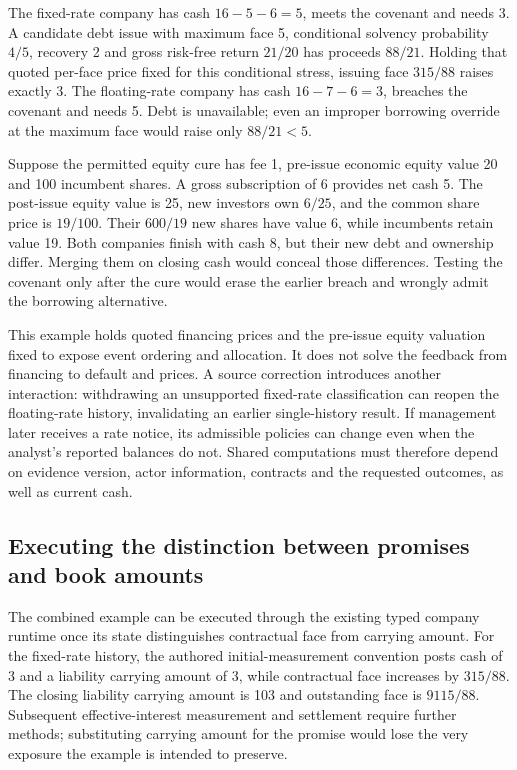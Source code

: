 \documentclass[11pt,a4paper]{article}
\begin{document}
The fixed-rate company has cash $16-5-6=5$, meets the covenant and needs 3.
A candidate debt issue with maximum face 5, conditional solvency probability
$4/5$, recovery 2 and gross risk-free return $21/20$ has proceeds $88/21$.
Holding that quoted per-face price fixed for this conditional stress, issuing
face $315/88$ raises exactly 3. The floating-rate company has cash
$16-7-6=3$, breaches the covenant and needs 5. Debt is unavailable; even an
improper borrowing override at the maximum face would raise only $88/21<5$.

Suppose the permitted equity cure has fee 1, pre-issue economic equity value
20 and 100 incumbent shares. A gross subscription of 6 provides net cash 5.
The post-issue equity value is 25, new investors own $6/25$, and the common
share price is $19/100$. Their $600/19$ new shares have value 6, while
incumbents retain value 19. Both companies finish with cash 8, but their new
debt and ownership differ. Merging them on closing cash would conceal those
differences. Testing the covenant only after the cure would erase the earlier
breach and wrongly admit the borrowing alternative.

This example holds quoted financing prices and the pre-issue equity valuation
fixed to expose event ordering and allocation. It does not solve the feedback
from financing to default and prices. A source correction introduces another
interaction: withdrawing an unsupported fixed-rate classification can reopen
the floating-rate history, invalidating an earlier single-history result.
If management later receives a rate notice, its admissible policies can change
even when the analyst's reported balances do not. Shared computations must
therefore depend on evidence version, actor information, contracts and the
requested outcomes, as well as current cash.



\subsection{Executing the distinction between promises and book amounts}
The combined example can be executed through the existing typed company
runtime once its state distinguishes contractual face from carrying amount.
For the fixed-rate history, the authored initial-measurement convention posts
cash of 3 and a liability carrying amount of 3, while contractual face increases
by $315/88$. The closing liability carrying amount is 103 and outstanding face
is $9115/88$. Subsequent effective-interest measurement and settlement require
further methods; substituting carrying amount for the promise would lose the
very exposure the example is intended to preserve.
\end{document}
